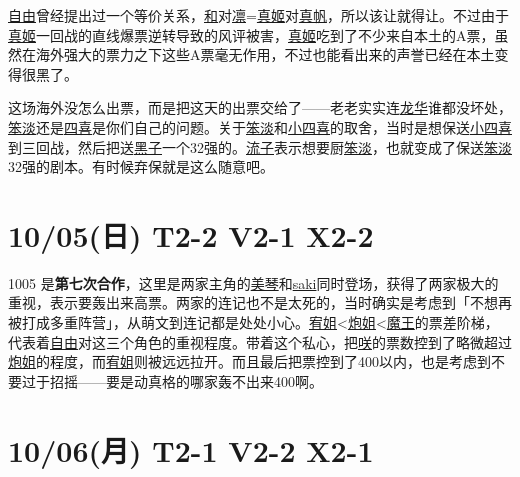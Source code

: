 \uline{自由}曾经提出过一个等价关系，\uline{和}对\uline{凛}=\uline{真姬}对\uline{真帆}，所以该让就得让。不过由于\uline{真姬}一回战的直线爆票逆转导致的风评被害，\uline{真姬}吃到了不少来自本土的A票，虽然在海外强大的票力之下这些A票毫无作用，不过也能看出来的声誉已经在本土变得很黑了。

这场海外没怎么出票，而是把这天的出票交给了——老老实实连\uline{龙华}谁都没坏处，\uline{笨淡}还是\uline{四喜}是你们自己的问题。关于\uline{笨淡}和\uline{小四喜}的取舍，当时是想保送\uline{小四喜}到三回战，然后把送\uline{黑子}一个32强的。\uline{流子}表示想要厨\uline{笨淡}，也就变成了保送\uline{笨淡}32强的剧本。有时候弃保就是这么随意吧。

\section{10/05(日) T2-2 V2-1 X2-2}


1005 是\textbf{第七次合作}，这里是两家主角的\uline{美琴}和\uline{saki}同时登场，获得了两家极大的重视，表示要轰出来高票。两家的连记也不是太死的，当时确实是考虑到「不想再被打成多重阵营」，从萌文到连记都是处处小心。\uline{宥姐}<\uline{炮姐}<\uline{魔王}的票差阶梯，代表着\uline{自由}对这三个角色的重视程度。带着这个私心，把\uline{咲}的票数控到了略微超过\uline{炮姐}的程度，而\uline{宥姐}则被远远拉开。而且最后把票控到了400以内，也是考虑到不要过于招摇——要是动真格的哪家轰不出来400啊。

\section{10/06(月) T2-1 V2-2 X2-1}


